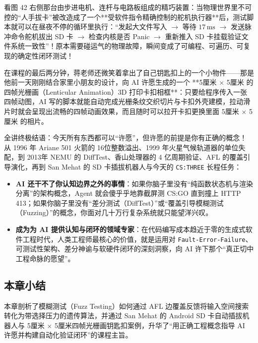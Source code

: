 \documentclass[a4paper]{article}
\begin{document}
看图 42 右侧那台由步进电机、连杆与电路板组成的精巧装置：当物理世界里不可控的“人手拔卡”被改造成了一个**受软件指令精确控制的舵机执行器**后，测试脚本就可以在昼夜不停的循环里执行：“发起大文件写入 $\to$ 等待 $17\,\mathrm{ms}$ $\to$ 发送脉冲命令舵机拔出 SD 卡 $\to$ 检查内核是否 Panic $\to$ 重新推入 SD 卡挂载验证文件系统一致性”！原本需要碰运气的物理故障，瞬间变成了可编程、可遍历、可复现的确定性闭环测试！

在课程的最后两分钟，蒋老师还微笑着拿出了自己钥匙扣上的一个小物件——那是他前一天刚刚结合家里小朋友的设计，向 AI 许愿生成的一个 **5厘米 $\times$ 5厘米 的四帧光栅画（Lenticular Animation）3D 打印卡扣相框**：只要给程序传入一张四帧动图，AI 写的脚本就能自动完成光栅条纹交织切片与卡扣外壳建模，拉动滑片时就会呈现出流畅的四帧动画效果，而且随时可以拉开卡扣更换里面 5厘米 $\times$ 5厘米 的相片。

\begin{importantbox}{全讲终极结语：今天所有东西都可以“许愿”，但许愿的前提是你有正确的概念！}
从 1996 年 Ariane 501 火箭的 16位整数溢出、1999 年火星气候轨道器的单位失配，到 2013年 NEMU 的 DiffTest、香山处理器的 4 亿周期验证、AFL 的覆盖引导演化，再到 San Mehat 的 SD 卡插拔机器人与今天的 \texttt{CS:THREE} 长程任务：
\begin{itemize}
    \item \textbf{AI 还干不了你认知边界之外的事情}：如果你脑子里没有“纯函数状态机与渲染分离”的架构概念，Agent 就会傻乎乎地靠截屏测 CS:GO 直到撞上 HTTP 413；如果你脑子里没有“差分测试（DiffTest）”或“覆盖引导模糊测试（Fuzzing）”的概念，你面对几十万行复杂系统就只能望洋兴叹。
    \item \textbf{成为为 AI 提供认知与闭环的领域专家}：在代码编写成本趋近于零的生成式软件工程时代，人类工程师最核心的价值，就是运用对 \texttt{Fault-Error-Failure}、可测试性架构、差分神谕与软硬件闭环的深刻洞察，向 AI 许下那个“真正切中工程命脉的愿望”。
\end{itemize}
\end{importantbox}

\subsection{本章小结}

本章剖析了模糊测试（Fuzz Testing）如何通过 AFL 边覆盖反馈将输入空间搜索转化为带选择压力的遗传算法，并通过 San Mehat 的 Android SD 卡自动插拔机器人与 5厘米 $\times$ 5厘米四帧光栅画钥匙扣案例，升华了“用正确工程概念指导 AI 许愿并构建自动化验证闭环”的课程主旨。

\newpage
\end{document}
